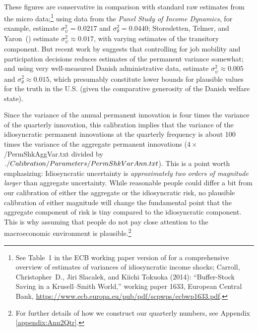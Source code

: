 \documentclass[titlepage]{\econtex}\newcommand{\texname}{cAndCwithStickyE}
\begin{document}
These figures are conservative in comparison with standard raw estimates from the micro data;\footnote{See Table~1 in the ECB working paper version of \cite{cstKS} for a comprehensive overview of estimates of variances of idiosyncratic income shocks; Carroll, Christopher~D., Jiri Slacalek, and Kiichi Tokuoka (2014): ``Buffer-Stock Saving in a Krusell--Smith World,'' working paper 1633, European Central Bank, \url{https://www.ecb.europa.eu/pub/pdf/scpwps/ecbwp1633.pdf}.} using data from the {\it Panel Study of Income Dynamics}, for example, \cite{carroll&samwick:nature} estimate $\sigma_{\psi}^{2} = 0.0217$ and $\sigma_{\theta}^{2} = 0.0440$; Storesletten, Telmer, and Yaron~(\citeyear{sty:consumption}) estimate $\sigma_{\psi}^{2} \approx 0.017$, with varying estimates of the transitory component.  But recent work by \cite{lmp:wagerisk} suggests that controlling for job mobility and participation decisions reduces estimates of the permanent variance somewhat; and using very well-measured Danish administrative data, \cite{nv:risk} estimate $\sigma_{\psi}^{2} \approx 0.005$ and $\sigma_{\theta}^{2} \approx 0.015$, which presumably constitute lower bounds for plausible values for the truth in the U.S. (given the comparative generosity of the Danish welfare state).

Since the variance of the annual permanent innovation is four times the variance of the quarterly innovation, this calibration implies that the variance of the idiosyncratic permanent innovations at the quarterly frequency is about 100 times the variance of the aggregate permanent innovations ($4 \times $ \ParmDir/PermShkAggVar.txt divided by $ ./Calibration/Parameters/PermShkVarAnn.txt $).  This is a point worth emphasizing: Idiosyncratic uncertainty is {\it approximately two orders of magnitude larger} than aggregate uncertainty.  While reasonable people could differ a bit from our calibration of either the aggregate or the idiosyncratic risk, no plausible calibration of either magnitude will change the fundamental point that the aggregate component of risk is tiny compared to the idiosyncratic component.  This is why assuming that people do not pay close attention to the macroeconomic environment is plausible.\footnote{For further details of how we construct our quarterly numbers, see Appendix \ref{appendix:Ann2Qtr}.}
\end{document}
